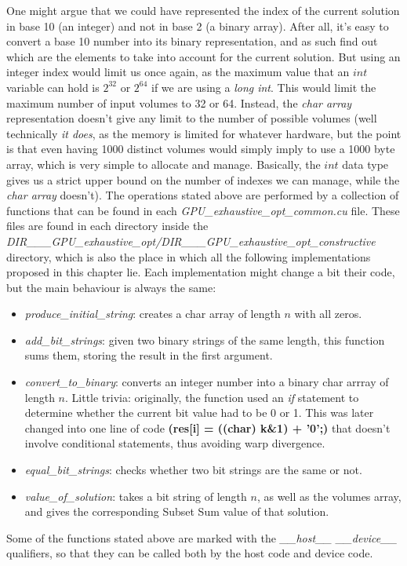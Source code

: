 \documentclass[12pt]{extarticle}
\begin{document}
 One might argue that we could have represented the index of the current solution in base 10 (an integer) and not in base 2 (a binary array). After all, it's easy to convert a base 10 number into its binary representation, and as such find out which are the elements to take into account for the current solution. But using an integer index would limit us once again, as the maximum value that an $int$ variable can hold is $2^{32}$ or $2^{64}$ if we are using a \emph{long int}. This would limit the maximum number of input volumes to 32 or 64. Instead, the \emph{char array} representation doesn't give any limit to the number of possible volumes (well technically \emph{it does}, as the memory is limited for whatever hardware, but the point is that even having 1000 distinct volumes would simply imply to use a 1000 byte array, which is very simple to allocate and manage. Basically, the $int$ data type gives us a strict upper bound on the number of indexes we can manage, while the \emph{char array} doesn't).\newline
 The operations stated above are performed by a collection of functions that can be found in each \emph{GPU\_exhaustive\_opt\_common.cu} file. These files are found in each directory inside the \emph{DIR\_\_\_GPU\_exhaustive\_opt/DIR\_\_\_GPU\_exhaustive\_opt\_constructive} directory, which is also the place in which all the following implementations proposed in this chapter lie. Each implementation might change a bit their code, but the main behaviour is always the same:
 \begin{itemize}
     \item \emph{produce\_initial\_string}: creates a char array of length $n$ with all zeros.
     \item \emph{add\_bit\_strings}: given two binary strings of the same length, this function sums them, storing the result in the first argument.
     \item \emph{convert\_to\_binary}: converts an integer number into a binary char arrray of length $n$. Little trivia: originally, the function used an \emph{if} statement to determine whether the current bit value had to be 0 or 1. This was later changed into one line of code \textbf{(res[i] = ((char) k\&1) + '0';)} that doesn't involve conditional statements, thus avoiding warp divergence.
     \item \emph{equal\_bit\_strings}: checks whether two bit strings are the same or not.
     \item \emph{value\_of\_solution}: takes a bit string of length $n$, as well as the volumes array, and gives the corresponding Subset Sum value of that solution.
 \end{itemize}
 Some of the functions stated above are marked with the \emph{\_\_host\_\_ \_\_device\_\_} qualifiers, so that they can be called both by the host code and device code.
\end{document}
